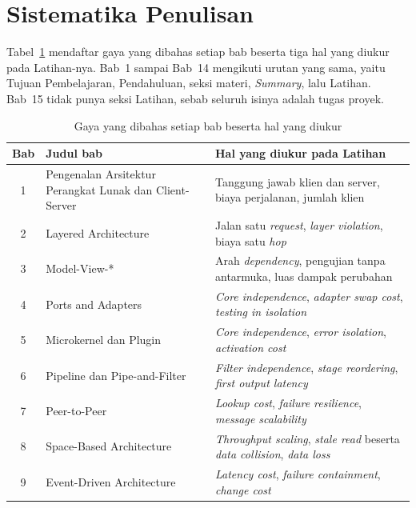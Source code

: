 \section*{Sistematika Penulisan}

Tabel~\ref{tab:peta-buku} mendaftar gaya yang dibahas setiap bab beserta tiga
hal yang diukur pada Latihan-nya. Bab~1 sampai Bab~14 mengikuti urutan yang
sama, yaitu Tujuan Pembelajaran, Pendahuluan, seksi materi, \textit{Summary},
lalu Latihan. Bab~15 tidak punya seksi Latihan, sebab seluruh isinya adalah
tugas proyek.

\begin{table}[htbp]
  \centering
  \caption{Gaya yang dibahas setiap bab beserta hal yang diukur}
  \label{tab:peta-buku}
  \begin{tabularx}{\textwidth}{|c|>{\raggedright\arraybackslash}p{3.6cm}%
    |>{\raggedright\arraybackslash}X|}
    \hline
    \textbf{Bab} & \textbf{Judul bab} & \textbf{Hal yang diukur pada Latihan} \\
    \hline
    1 & Pengenalan Arsitektur Perangkat Lunak dan Client-Server &
      Tanggung jawab klien dan server, biaya perjalanan, jumlah klien \\
    \hline
    2 & Layered Architecture & Jalan satu \textit{request}, \textit{layer
      violation}, biaya satu \textit{hop} \\
    \hline
    3 & Model-View-* & Arah \textit{dependency}, pengujian tanpa antarmuka,
      luas dampak perubahan \\
    \hline
    4 & Ports and Adapters & \textit{Core independence}, \textit{adapter swap
      cost}, \textit{testing in isolation} \\
    \hline
    5 & Microkernel dan Plugin & \textit{Core independence}, \textit{error
      isolation}, \textit{activation cost} \\
    \hline
    6 & Pipeline dan Pipe-and-Filter & \textit{Filter independence},
      \textit{stage reordering}, \textit{first output latency} \\
    \hline
    7 & Peer-to-Peer & \textit{Lookup cost}, \textit{failure resilience},
      \textit{message scalability} \\
    \hline
    8 & Space-Based Architecture & \textit{Throughput scaling}, \textit{stale
      read} beserta \textit{data collision}, \textit{data loss} \\
    \hline
    9 & Event-Driven Architecture & \textit{Latency cost}, \textit{failure
      containment}, \textit{change cost} \\

\end{tabularx}
\end{table}
